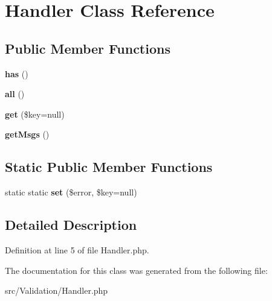 \hypertarget{class_zest_1_1_validation_1_1_handler}{}\section{Handler Class Reference}
\label{class_zest_1_1_validation_1_1_handler}
\subsection*{Public Member Functions}
\begin{DoxyCompactItemize}
\item 
\mbox{\label{class_zest_1_1_validation_1_1_handler_a9db60e5b2881ca151b1780e9a4e08560}} 
{\bfseries has} ()
\item 
\mbox{\label{class_zest_1_1_validation_1_1_handler_af9d14e4ae6227970ad603987781573ca}} 
{\bfseries all} ()
\item 
\mbox{\label{class_zest_1_1_validation_1_1_handler_a35cbcd6b22933128eaaa6ded4e8d9aef}} 
{\bfseries get} (\$key=null)
\item 
\mbox{\label{class_zest_1_1_validation_1_1_handler_aa747c460876a1e019f3974fffa245777}} 
{\bfseries get\+Msgs} ()
\end{DoxyCompactItemize}
\subsection*{Static Public Member Functions}
\begin{DoxyCompactItemize}
\item 
\mbox{\label{class_zest_1_1_validation_1_1_handler_a6a94c221ca2595fd0f80501a5dcbbe69}} 
static static {\bfseries set} (\$error, \$key=null)
\end{DoxyCompactItemize}


\subsection{Detailed Description}


Definition at line 5 of file Handler.\+php.



The documentation for this class was generated from the following file\+:\begin{DoxyCompactItemize}
\item 
src/\+Validation/Handler.\+php\end{DoxyCompactItemize}

